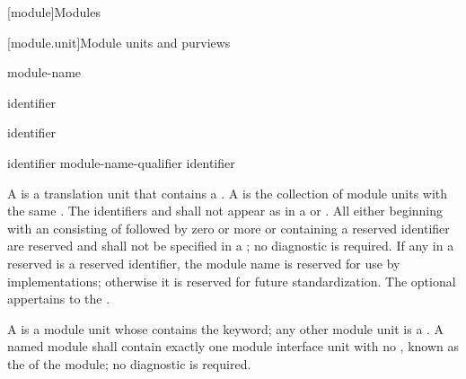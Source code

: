 [module]{Modules}%


[module.unit]{Module units and purviews}

\begin{bnf}
\br
      module-name   \terminal{;}
\end{bnf}

\begin{bnf}
\br
     identifier
\end{bnf}

\begin{bnf}
\br
    \terminal{:}  identifier
\end{bnf}

\begin{bnf}
\br
    identifier \br
    module-name-qualifier identifier 
\end{bnf}

\pnum
A  is a translation unit that contains
a .
A  is the
collection of module units with the same .
The identifiers  and 
shall not appear as 
in a  or .
%
All  either beginning with an 
consisting of  followed by zero or more  or
containing a reserved identifier
are reserved and shall not be specified in a ;
no diagnostic is required.
If any  in a reserved 
is a reserved identifier,
the module name is reserved for use by \Cpp{} implementations;
otherwise it is reserved for future standardization.
The optional 
appertains to the .

\pnum
A  is a module unit whose
 contains the  keyword;
any other module unit is a .
A named module shall contain exactly one module interface unit
with no , known as the
 of the module;
no diagnostic is required.

